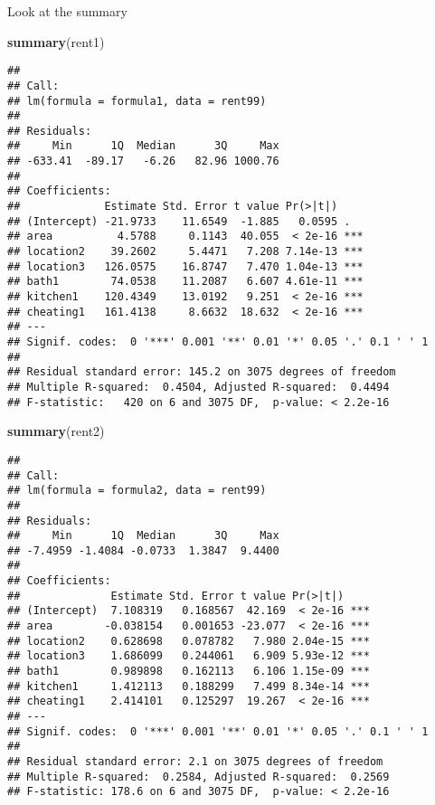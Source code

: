 \documentclass[]{article}
\newenvironment{Shaded}{\begin{snugshade}}{\end{snugshade}}
\newcommand{\KeywordTok}[1]{\textcolor[rgb]{0.13,0.29,0.53}{\textbf{#1}}}
\newcommand{\NormalTok}[1]{#1}
\begin{document}
Look at the summary

\begin{Shaded}
\begin{Highlighting}[]
\KeywordTok{summary}\NormalTok{(rent1)}
\end{Highlighting}
\end{Shaded}

\begin{verbatim}
## 
## Call:
## lm(formula = formula1, data = rent99)
## 
## Residuals:
##     Min      1Q  Median      3Q     Max 
## -633.41  -89.17   -6.26   82.96 1000.76 
## 
## Coefficients:
##             Estimate Std. Error t value Pr(>|t|)    
## (Intercept) -21.9733    11.6549  -1.885   0.0595 .  
## area          4.5788     0.1143  40.055  < 2e-16 ***
## location2    39.2602     5.4471   7.208 7.14e-13 ***
## location3   126.0575    16.8747   7.470 1.04e-13 ***
## bath1        74.0538    11.2087   6.607 4.61e-11 ***
## kitchen1    120.4349    13.0192   9.251  < 2e-16 ***
## cheating1   161.4138     8.6632  18.632  < 2e-16 ***
## ---
## Signif. codes:  0 '***' 0.001 '**' 0.01 '*' 0.05 '.' 0.1 ' ' 1
## 
## Residual standard error: 145.2 on 3075 degrees of freedom
## Multiple R-squared:  0.4504, Adjusted R-squared:  0.4494 
## F-statistic:   420 on 6 and 3075 DF,  p-value: < 2.2e-16
\end{verbatim}

\begin{Shaded}
\begin{Highlighting}[]
\KeywordTok{summary}\NormalTok{(rent2)}
\end{Highlighting}
\end{Shaded}

\begin{verbatim}
## 
## Call:
## lm(formula = formula2, data = rent99)
## 
## Residuals:
##     Min      1Q  Median      3Q     Max 
## -7.4959 -1.4084 -0.0733  1.3847  9.4400 
## 
## Coefficients:
##              Estimate Std. Error t value Pr(>|t|)    
## (Intercept)  7.108319   0.168567  42.169  < 2e-16 ***
## area        -0.038154   0.001653 -23.077  < 2e-16 ***
## location2    0.628698   0.078782   7.980 2.04e-15 ***
## location3    1.686099   0.244061   6.909 5.93e-12 ***
## bath1        0.989898   0.162113   6.106 1.15e-09 ***
## kitchen1     1.412113   0.188299   7.499 8.34e-14 ***
## cheating1    2.414101   0.125297  19.267  < 2e-16 ***
## ---
## Signif. codes:  0 '***' 0.001 '**' 0.01 '*' 0.05 '.' 0.1 ' ' 1
## 
## Residual standard error: 2.1 on 3075 degrees of freedom
## Multiple R-squared:  0.2584, Adjusted R-squared:  0.2569 
## F-statistic: 178.6 on 6 and 3075 DF,  p-value: < 2.2e-16
\end{verbatim}
\end{document}
